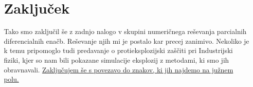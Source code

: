 \documentclass{article}
\begin{document}
\section{Zaključek}
Tako smo zaključil še z zadnjo nalogo v skupini numeričnega reševanja parcialnih diferencialnih enačb. Reševanje njih mi je postalo kar precej zanimivo. Nekoliko je k temu pripomoglo tudi predavanje o protieksplozijski zaščiti pri Industrijski fiziki, kjer so nam bili pokazane simulacije eksplozij z metodami, ki smo jih obravnavali. \href{https://brr.fyi/posts/south-pole-signage}{Zaključujem še s povezavo do znakov, ki jih najdemo na južnem polu.}
\end{document}
